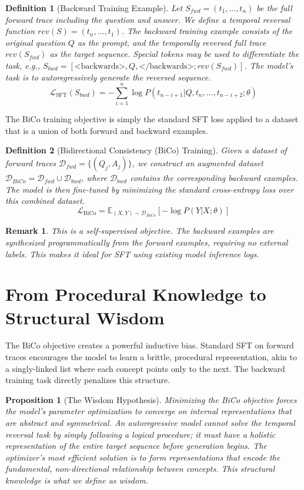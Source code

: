 \documentclass[11pt]{article}
\newtheorem{definition}{Definition}
\newtheorem{remark}{Remark}
\newtheorem{proposition}{Proposition}
\begin{document}
\begin{definition}[Backward Training Example]
Let $S_{fwd} = (t_1, ..., t_n)$ be the full forward trace including the question and answer. We define a temporal reversal function $rev(S) = (t_n, ..., t_1)$. The backward training example consists of the original question $Q$ as the prompt, and the temporally reversed full trace $rev(S_{fwd})$ as the target sequence. Special tokens may be used to differentiate the task, e.g., $S_{bwd} = [\text{<backwards>}, Q, \text{</backwards>}; rev(S_{fwd})]$. The model's task is to autoregressively generate the reversed sequence.
\[ \mathcal{L}_{\text{SFT}}(S_{bwd}) = -\sum_{i=1}^{n} \log P(t_{n-i+1} | Q, t_n, ..., t_{n-i+2}; \theta) \]
\end{definition}

The BiCo training objective is simply the standard SFT loss applied to a dataset that is a union of both forward and backward examples.

\begin{definition}[Bidirectional Consistency (BiCo) Training]
Given a dataset of forward traces $\mathcal{D}_{fwd} = \{(Q_j, A_j)\}$, we construct an augmented dataset $\mathcal{D}_{BiCo} = \mathcal{D}_{fwd} \cup \mathcal{D}_{bwd}$, where $\mathcal{D}_{bwd}$ contains the corresponding backward examples. The model is then fine-tuned by minimizing the standard cross-entropy loss over this combined dataset.
\[ \mathcal{L}_{\text{BiCo}} = \mathbb{E}_{(X, Y) \sim \mathcal{D}_{BiCo}} [-\log P(Y|X; \theta)] \]
\end{definition}

\begin{remark}
This is a self-supervised objective. The backward examples are synthesized programmatically from the forward examples, requiring no external labels. This makes it ideal for SFT using existing model inference logs.
\end{remark}

\section{From Procedural Knowledge to Structural Wisdom}
The BiCo objective creates a powerful inductive bias. Standard SFT on forward traces encourages the model to learn a brittle, procedural representation, akin to a singly-linked list where each concept points only to the next. The backward training task directly penalizes this structure.

\begin{proposition}[The Wisdom Hypothesis]
Minimizing the BiCo objective forces the model's parameter optimization to converge on internal representations that are abstract and symmetrical. An autoregressive model cannot solve the temporal reversal task by simply following a logical procedure; it must have a holistic representation of the entire target sequence before generation begins. The optimizer's most efficient solution is to form representations that encode the fundamental, non-directional relationship between concepts. This structural knowledge is what we define as wisdom.
\end{proposition}
\end{document}
